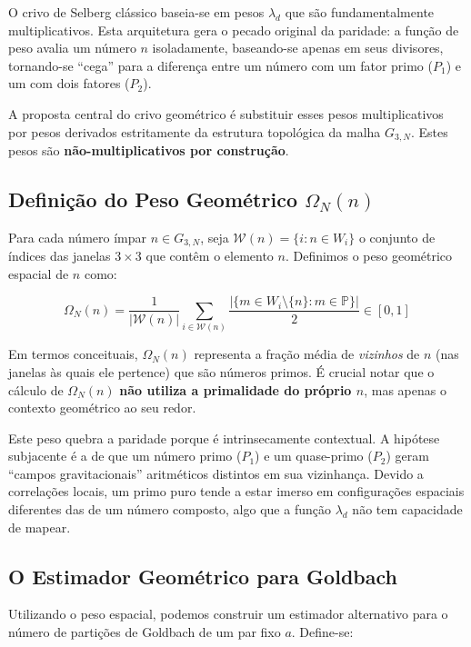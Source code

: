 \documentclass[12pt,a4paper]{article}
\theoremstyle{remark}
\begin{document}
	O crivo de Selberg clássico baseia-se em pesos $\lambda_d$ que são fundamentalmente multiplicativos. Esta arquitetura gera o pecado original da paridade: a função de peso avalia um número $n$ isoladamente, baseando-se apenas em seus divisores, tornando-se ``cega'' para a diferença entre um número com um fator primo ($P_1$) e um com dois fatores ($P_2$).
	
	A proposta central do crivo geométrico é substituir esses pesos multiplicativos por pesos derivados estritamente da estrutura topológica da malha $G_{3,N}$. Estes pesos são \textbf{não-multiplicativos por construção}.
	
	\subsection{Definição do Peso Geométrico $\Omega_N(n)$}
	
	Para cada número ímpar $n \in G_{3,N}$, seja $\mathcal{W}(n) = \{i : n \in W_i\}$ o conjunto de índices das janelas $3 \times 3$ que contêm o elemento $n$. Definimos o peso geométrico espacial de $n$ como:
	
	\begin{equation}
		\Omega_N(n) = \frac{1}{|\mathcal{W}(n)|} \sum_{i \in \mathcal{W}(n)} \frac{|\{m \in W_i \setminus \{n\} : m \in \mathbb{P}\}|}{2} \in [0, 1]
	\end{equation}
	
	Em termos conceituais, $\Omega_N(n)$ representa a fração média de \textit{vizinhos} de $n$ (nas janelas às quais ele pertence) que são números primos. É crucial notar que o cálculo de $\Omega_N(n)$ \textbf{não utiliza a primalidade do próprio $n$}, mas apenas o contexto geométrico ao seu redor.
	
	Este peso quebra a paridade porque é intrinsecamente contextual. A hipótese subjacente é a de que um número primo ($P_1$) e um quase-primo ($P_2$) geram ``campos gravitacionais'' aritméticos distintos em sua vizinhança. Devido a correlações locais, um primo puro tende a estar imerso em configurações espaciais diferentes das de um número composto, algo que a função $\lambda_d$ não tem capacidade de mapear.
	
	\subsection{O Estimador Geométrico para Goldbach}
	
	Utilizando o peso espacial, podemos construir um estimador alternativo para o número de partições de Goldbach de um par fixo $a$. Define-se:
	
\end{document}
